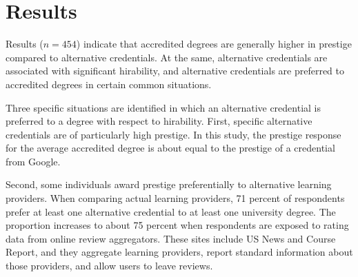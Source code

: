 \documentclass[review]{elsarticle}
\begin{document}

\section{Results}

Results ($n = 454$) indicate that accredited degrees are generally higher in prestige compared to alternative credentials.
At the same, alternative credentials are associated with significant hirability,
and alternative credentials are preferred to accredited degrees in certain common situations.

Three specific situations are identified in which an alternative credential is preferred to a degree with respect to hirability.
First, specific alternative credentials are of particularly high prestige.
In this study, the prestige response for the average accredited degree is about equal to the prestige of a credential from Google.

Second, some individuals award prestige preferentially to alternative learning providers.
When comparing actual learning providers,
71 percent of respondents prefer at least one alternative credential to at least one university degree.
The proportion increases to about 75 percent when respondents are exposed to rating data from online review aggregators.
These sites include US News and Course Report, and they aggregate learning providers,
report standard information about those providers,
and allow users to leave reviews.
\end{document}
